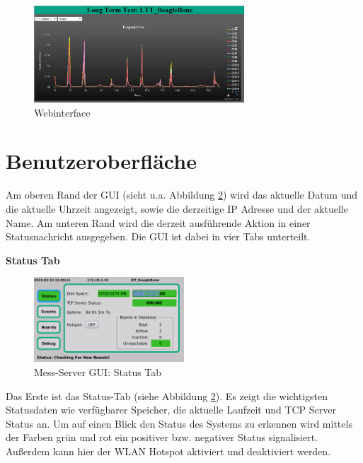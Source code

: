 \begin{figure}[H]
\begin{center}
\includegraphics[width=0.7\textwidth ]{img/general/Webinterface.png}
\caption{Webinterface}
\label{figure_Webinterface}
\end{center}
\end{figure}

\newpage
\section{Benutzeroberfläche}
Am oberen Rand der \ac{GUI} (sieht u.a. Abbildung \ref{figure_MessServerGUIStatus}) wird das aktuelle Datum und die aktuelle Uhrzeit angezeigt, sowie die derzeitige IP Adresse und der aktuelle Name. Am unteren Rand wird die derzeit ausführende Aktion in einer Statusnachricht ausgegeben.
Die \ac{GUI} ist dabei in vier Tabs unterteilt.


\textbf{Status Tab}

\begin{figure}[H]
\begin{center}
\includegraphics[width=0.5\textwidth ]{img/GUI/Server_GUI_Status1.png}
\caption{Mess-Server GUI: Status Tab}
\label{figure_MessServerGUIStatus}
\end{center}
\end{figure}

Das Erste ist das Status-Tab (siehe Abbildung \ref{figure_MessServerGUIStatus}). Es zeigt die wichtigsten Statusdaten wie verfügbarer Speicher, die aktuelle Laufzeit und TCP Server Status an. Um auf einen Blick den Status des Systems zu erkennen wird mittels der Farben grün und rot ein positiver bzw. negativer Status signalisiert. Außerdem kann hier der WLAN Hotspot aktiviert und deaktiviert werden.

